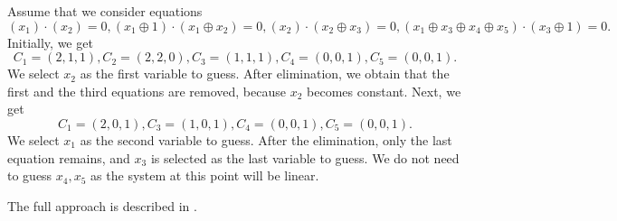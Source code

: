 \begin{example}
Assume that we consider equations
$$
(x_1) \cdot (x_2)=0,
(x_1 \oplus 1) \cdot (x_1 \oplus x_2) = 0,
(x_2) \cdot (x_2 \oplus x_3) = 0,
(x_1 \oplus x_3 \oplus x_4 \oplus x_5) \cdot (x_3 \oplus 1) = 0.
$$
Initially, we get
$$
C_1 = (2, 1, 1), C_2 = (2, 2, 0), C_3 = (1, 1, 1), C_4 = (0, 0, 1), C_5 = (0, 0, 1).
$$
We select $x_2$ as the first variable to guess. After elimination, we obtain that the first and the third equations are removed, because $x_2$ becomes constant. Next, we get
$$
C_1 = (2, 0, 1), C_3 = (1, 0, 1), C_4 = (0, 0, 1), C_5 = (0, 0, 1).
$$
We select $x_1$ as the second variable to guess. 
After the elimination, only the last equation remains, and $x_3$ is selected as the last variable to guess. We do not need to guess $x_4,x_5$ as the system at this point will be linear.
\end{example}








The full approach is described in .

